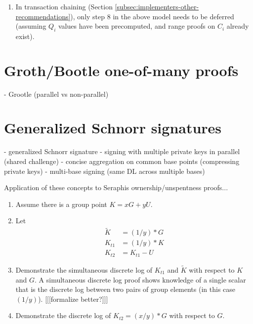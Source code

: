 \begin{appendices}
\begin{enumerate}
    \item In transaction chaining (Section \ref{subsec:implementers-other-recommendations}), only step 8 in the above model needs to be deferred (assuming $Q_i$ values have been precomputed, and range proofs on $C_i$ already exist).
\end{enumerate}



\section{Groth/Bootle one-of-many proofs}
\label{appendix:grootle-one-of-many-proofs}

- Grootle (parallel vs non-parallel)



\section{Generalized Schnorr signatures}
\label{appendix:generalized-schnorr-signatures}

- generalized Schnorr signature
    - signing with multiple private keys in parallel (shared challenge)
    - concise aggregation on common base points (compressing private keys)
    - multi-base signing (same DL across multiple bases)

Application of these concepts to Seraphis ownership/unspentness proofs...

\begin{enumerate}
    \item Assume there is a group point $K = x G + y U$.

    \item Let\vspace{.115cm}
    \begin{align*}
        \tilde{K} &= (1/y)*G \\
        K_{t1} &= (1/y)*K \\
        K_{t2} &= K_{t1} - U
    \end{align*}

    \item Demonstrate the simultaneous discrete log of $K_{t1}$ and $\tilde{K}$ with respect to $K$ and $G$. A simultaneous discrete log proof shows knowledge of a single scalar that is the discrete log between two pairs of group elements (in this case $(1/y)$). [[[formalize better?]]]

    \item Demonstrate the discrete log of $K_{t2} = (x/y)*G$ with respect to $G$.
\end{enumerate}


\end{appendices}